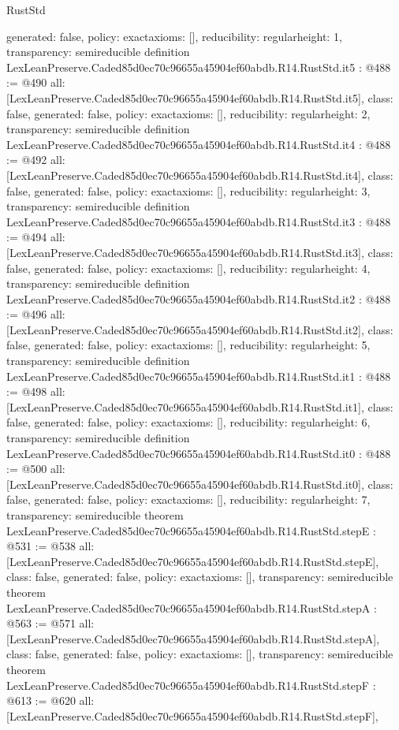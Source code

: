 \begin{lexlean}{RustStd}
\begin{coremodule}
{  generated: false,
  policy: exact{axioms: []},
  reducibility: regular{height: 1},
  transparency: semireducible
}
definition LexLeanPreserve.Caded85d0ec70c96655a45904ef60abdb.R14.RustStd.it5 : @488 := @490 {
  all: [LexLeanPreserve.Caded85d0ec70c96655a45904ef60abdb.R14.RustStd.it5],
  class: false,
  generated: false,
  policy: exact{axioms: []},
  reducibility: regular{height: 2},
  transparency: semireducible
}
definition LexLeanPreserve.Caded85d0ec70c96655a45904ef60abdb.R14.RustStd.it4 : @488 := @492 {
  all: [LexLeanPreserve.Caded85d0ec70c96655a45904ef60abdb.R14.RustStd.it4],
  class: false,
  generated: false,
  policy: exact{axioms: []},
  reducibility: regular{height: 3},
  transparency: semireducible
}
definition LexLeanPreserve.Caded85d0ec70c96655a45904ef60abdb.R14.RustStd.it3 : @488 := @494 {
  all: [LexLeanPreserve.Caded85d0ec70c96655a45904ef60abdb.R14.RustStd.it3],
  class: false,
  generated: false,
  policy: exact{axioms: []},
  reducibility: regular{height: 4},
  transparency: semireducible
}
definition LexLeanPreserve.Caded85d0ec70c96655a45904ef60abdb.R14.RustStd.it2 : @488 := @496 {
  all: [LexLeanPreserve.Caded85d0ec70c96655a45904ef60abdb.R14.RustStd.it2],
  class: false,
  generated: false,
  policy: exact{axioms: []},
  reducibility: regular{height: 5},
  transparency: semireducible
}
definition LexLeanPreserve.Caded85d0ec70c96655a45904ef60abdb.R14.RustStd.it1 : @488 := @498 {
  all: [LexLeanPreserve.Caded85d0ec70c96655a45904ef60abdb.R14.RustStd.it1],
  class: false,
  generated: false,
  policy: exact{axioms: []},
  reducibility: regular{height: 6},
  transparency: semireducible
}
definition LexLeanPreserve.Caded85d0ec70c96655a45904ef60abdb.R14.RustStd.it0 : @488 := @500 {
  all: [LexLeanPreserve.Caded85d0ec70c96655a45904ef60abdb.R14.RustStd.it0],
  class: false,
  generated: false,
  policy: exact{axioms: []},
  reducibility: regular{height: 7},
  transparency: semireducible
}
theorem LexLeanPreserve.Caded85d0ec70c96655a45904ef60abdb.R14.RustStd.stepE : @531 := @538 {
  all: [LexLeanPreserve.Caded85d0ec70c96655a45904ef60abdb.R14.RustStd.stepE],
  class: false,
  generated: false,
  policy: exact{axioms: []},
  transparency: semireducible
}
theorem LexLeanPreserve.Caded85d0ec70c96655a45904ef60abdb.R14.RustStd.stepA : @563 := @571 {
  all: [LexLeanPreserve.Caded85d0ec70c96655a45904ef60abdb.R14.RustStd.stepA],
  class: false,
  generated: false,
  policy: exact{axioms: []},
  transparency: semireducible
}
theorem LexLeanPreserve.Caded85d0ec70c96655a45904ef60abdb.R14.RustStd.stepF : @613 := @620 {
  all: [LexLeanPreserve.Caded85d0ec70c96655a45904ef60abdb.R14.RustStd.stepF],
}
\end{coremodule}
\end{lexlean}
